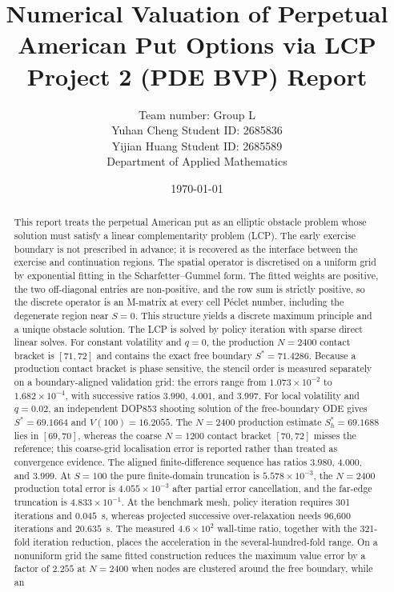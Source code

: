 \documentclass[11pt,a4paper]{article}
\title{\textbf{Numerical Valuation of Perpetual American Put Options via LCP}\\[2mm]
\large Project 2 (PDE BVP) Report}
\author{
    \small Team number: Group L\\
    \small Yuhan Cheng \quad Student ID: 2685836\\
    \small Yijian Huang \quad Student ID: 2685589\\
    \small Department of Applied Mathematics
}
\date{\today}
\theoremstyle{definition}
\theoremstyle{remark}
\begin{document}
\maketitle

\begin{abstract}
\noindent
This report treats the perpetual American put as an elliptic obstacle problem
whose solution must satisfy a linear complementarity problem (LCP). The early
exercise boundary is not prescribed in advance; it is recovered as the
interface between the exercise and continuation regions. The spatial operator
is discretised on a uniform grid by exponential fitting in the
Scharfetter--Gummel form. The fitted weights are positive, the two
off-diagonal entries are non-positive, and the row sum is strictly positive,
so the discrete operator is an M-matrix at every cell P\'eclet number,
including the degenerate region near $S=0$. This structure yields a discrete
maximum principle and a unique obstacle solution. The LCP is solved by policy
iteration with sparse direct linear solves. For constant volatility and
$q=0$, the production $N=2400$ contact bracket is $[71,72]$ and contains the
exact free boundary $S^*=71.4286$. Because a production contact bracket is
phase sensitive, the stencil order is measured separately on a
boundary-aligned validation grid: the errors range from
$1.073\times10^{-2}$ to $1.682\times10^{-4}$, with successive ratios
$3.990$, $4.001$, and $3.997$. For local volatility and $q=0.02$, an
independent DOP853 shooting solution of the free-boundary ODE gives
$S^*=69.1664$ and $V(100)=16.2055$. The $N=2400$ production estimate
$S_h^*=69.1688$ lies in $[69,70]$, whereas the coarse $N=1200$ contact
bracket $[70,72]$ misses the reference; this coarse-grid localisation error
is reported rather than treated as convergence evidence. The aligned
finite-difference sequence has ratios $3.980$, $4.000$, and $3.999$. At
$S=100$ the pure finite-domain truncation is $5.578\times10^{-3}$, the
$N=2400$ production total error is $4.055\times10^{-3}$ after partial
error cancellation, and the far-edge truncation is
$4.833\times10^{-1}$. At the benchmark mesh,
policy iteration requires 301 iterations and $0.045$~s, whereas projected
successive over-relaxation needs 96{,}600 iterations and $20.635$~s. The
measured $4.6\times10^2$ wall-time ratio, together with the 321-fold
iteration reduction, places the acceleration in the several-hundred-fold
range. On a nonuniform grid the same fitted
construction reduces the maximum value error by a factor of $2.255$ at
$N=2400$ when nodes are clustered around the free boundary, while an

\end{abstract}
\end{document}
